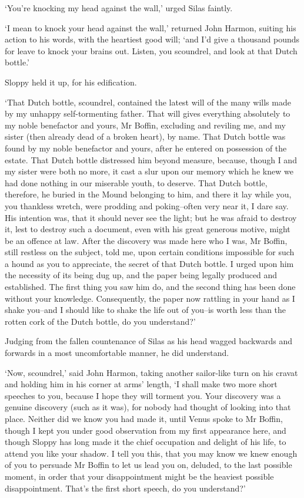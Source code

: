 ‘You’re knocking my head against the wall,’ urged Silas faintly.

‘I mean to knock your head against the wall,’ returned John Harmon,
suiting his action to his words, with the heartiest good will; ‘and I’d
give a thousand pounds for leave to knock your brains out. Listen, you
scoundrel, and look at that Dutch bottle.’

Sloppy held it up, for his edification.

‘That Dutch bottle, scoundrel, contained the latest will of the many
wills made by my unhappy self-tormenting father. That will gives
everything absolutely to my noble benefactor and yours, Mr Boffin,
excluding and reviling me, and my sister (then already dead of a broken
heart), by name. That Dutch bottle was found by my noble benefactor and
yours, after he entered on possession of the estate. That Dutch bottle
distressed him beyond measure, because, though I and my sister were
both no more, it cast a slur upon our memory which he knew we had
done nothing in our miserable youth, to deserve. That Dutch bottle,
therefore, he buried in the Mound belonging to him, and there it lay
while you, you thankless wretch, were prodding and poking--often very
near it, I dare say. His intention was, that it should never see the
light; but he was afraid to destroy it, lest to destroy such a document,
even with his great generous motive, might be an offence at law. After
the discovery was made here who I was, Mr Boffin, still restless on the
subject, told me, upon certain conditions impossible for such a hound as
you to appreciate, the secret of that Dutch bottle. I urged upon him the
necessity of its being dug up, and the paper being legally produced and
established. The first thing you saw him do, and the second thing has
been done without your knowledge. Consequently, the paper now rattling
in your hand as I shake you--and I should like to shake the life out
of you--is worth less than the rotten cork of the Dutch bottle, do you
understand?’

Judging from the fallen countenance of Silas as his head wagged
backwards and forwards in a most uncomfortable manner, he did
understand.

‘Now, scoundrel,’ said John Harmon, taking another sailor-like turn on
his cravat and holding him in his corner at arms’ length, ‘I shall make
two more short speeches to you, because I hope they will torment you.
Your discovery was a genuine discovery (such as it was), for nobody had
thought of looking into that place. Neither did we know you had made it,
until Venus spoke to Mr Boffin, though I kept you under good observation
from my first appearance here, and though Sloppy has long made it
the chief occupation and delight of his life, to attend you like your
shadow. I tell you this, that you may know we knew enough of you to
persuade Mr Boffin to let us lead you on, deluded, to the last possible
moment, in order that your disappointment might be the heaviest possible
disappointment. That’s the first short speech, do you understand?’

